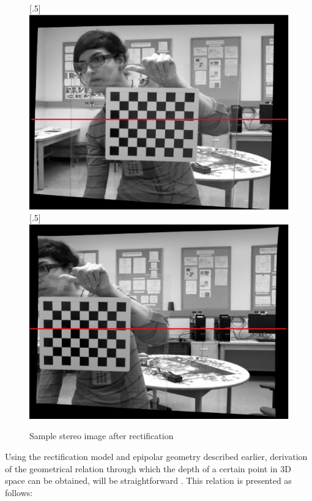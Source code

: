 \begin{figure}[H]
\centering
{}
[.5\linewidth]{\includegraphics[scale=0.35]{rectLmark}}%
[.5\linewidth]{\includegraphics[scale=0.35]{rectRmark}}%
\caption{Sample stereo image after rectification}
\label{fig:rect}
\end{figure}

Using the rectification model and epipolar geometry described earlier, 
derivation of the geometrical relation through which the depth of a certain point in 3D space 
can be obtained, will be straightforward \cite{sze11}. This relation is presented as follows:

